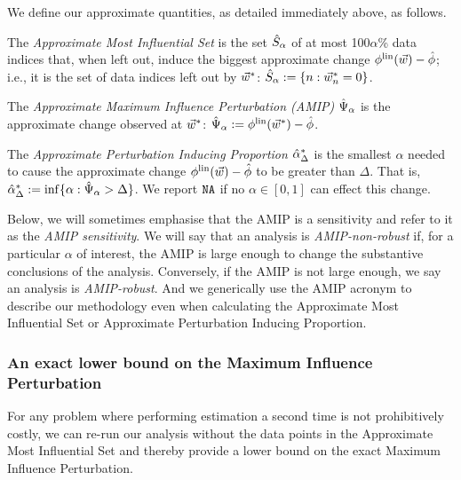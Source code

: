 We define our approximate quantities, as detailed immediately above, as follows.
%
\begin{defn} 
%
The \emph{Approximate Most Influential Set} is the set $\hat{S}_{\alpha}$ of at
most 100$\alpha$\% data indices that, when left out, induce the biggest
approximate change $\phi^{\mathrm{lin}}(\vec{w}) - \hat{\phi}$; i.e., it is the set of
data indices left out by $\vec{w}^*$: $\hat{S}_{\alpha} := \left\{n: \vec{w}^{*}_n = 0
\right\}$.

The \emph{Approximate Maximum Influence Perturbation (AMIP)} $\hat{\Psi}_{\alpha}$ is
the approximate change observed at $\vec{w}^*$: $\hat{\Psi}_{\alpha} :=
\phi^{\mathrm{lin}}(\vec{w}^{*}) - \hat{\phi}$.

The \emph{Approximate Perturbation Inducing Proportion} $\hat{\alpha}^*_{\Delta}$ is
the smallest $\alpha$ needed to cause the approximate change $\phi^{\mathrm{lin}}(\vec{w}) -
\hat{\phi}$ to be greater than $\Delta$. That is, $\hat{\alpha}^*_{\Delta} := \inf\{
\alpha: \hat{\Psi}_{\alpha} > \Delta\}$. We report $\texttt{NA}$ if no $\alpha \in [0,1]$ can
effect this change.
%
\end{defn}

Below, we will sometimes emphasise that the AMIP is a sensitivity and refer to
it as the \emph{AMIP sensitivity}. We will say that an analysis is
\emph{AMIP-non-robust} if, for a particular $\alpha$ of interest, the AMIP is
large enough to change the substantive conclusions of the analysis.  Conversely,
if the AMIP is not large enough, we say an analysis is \emph{AMIP-robust}.
And we generically use the AMIP acronym to describe our
methodology even when calculating the Approximate Most Influential Set or
Approximate Perturbation Inducing Proportion.

\subsubsection{An exact lower bound on the Maximum Influence Perturbation}

For any problem where performing estimation a second time is not prohibitively
costly, we can re-run our analysis without the data points in the Approximate
Most Influential Set and thereby provide a lower bound on the exact Maximum
Influence Perturbation.

